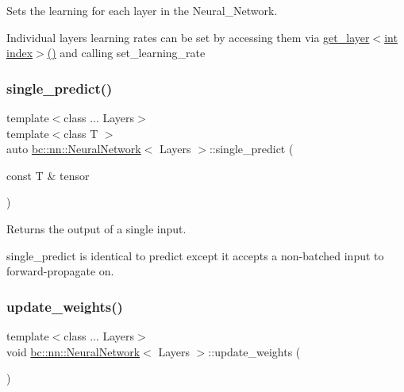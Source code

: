 Sets the learning for each layer in the Neural\+\_\+\+Network. 

Individual layer\textquotesingle{}s learning rates can be set by accessing them via \textquotesingle{}\hyperlink{structbc_1_1nn_1_1NeuralNetwork_a99f24e40c4a36e62896e27ee84040af2}{get\+\_\+layer$<$int index$>$()}\textquotesingle{} and calling \textquotesingle{}set\+\_\+learning\+\_\+rate\textquotesingle{} \mbox{\label{structbc_1_1nn_1_1NeuralNetwork_ac2fbb1a8f2d9cf6cd82427bcf84d79ad}} 
\subsubsection{\texorpdfstring{single\+\_\+predict()}{single\_predict()}}
{\footnotesize\ttfamily template$<$class ... Layers$>$ \\
template$<$class T $>$ \\
auto \hyperlink{structbc_1_1nn_1_1NeuralNetwork}{bc\+::nn\+::\+Neural\+Network}$<$ Layers $>$\+::single\+\_\+predict (\begin{DoxyParamCaption}\item[{const T \&}]{tensor }\end{DoxyParamCaption})\hspace{0.3cm}{\ttfamily [inline]}}



Returns the output of a single input. 

single\+\_\+predict is identical to predict except it accepts a non-\/batched input to forward-\/propagate on. \mbox{\label{structbc_1_1nn_1_1NeuralNetwork_a28d1d6cf01f8bf959987cb9bdcd2bf79}} 
\subsubsection{\texorpdfstring{update\+\_\+weights()}{update\_weights()}}
{\footnotesize\ttfamily template$<$class ... Layers$>$ \\
void \hyperlink{structbc_1_1nn_1_1NeuralNetwork}{bc\+::nn\+::\+Neural\+Network}$<$ Layers $>$\+::update\+\_\+weights (\begin{DoxyParamCaption}{ }\end{DoxyParamCaption})\hspace{0.3cm}{\ttfamily [inline]}}



